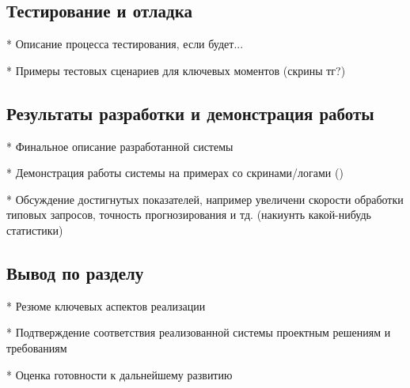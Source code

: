 \subsection{Тестирование и отладка}

*   Описание процесса тестирования, если будет...

*   Примеры тестовых сценариев для ключевых моментов (скрины тг?)

\subsection{Результаты разработки и демонстрация работы}

*   Финальное описание разработанной системы

*   Демонстрация работы системы на примерах со скринами/логами ()

*   Обсуждение достигнутых показателей, например увеличени скорости обработки типовых запросов, точность прогнозирования и тд. (накиунть какой-нибудь статистики)


\subsection{Вывод по разделу}

*   Резюме ключевых аспектов реализации

*   Подтверждение соответствия реализованной системы проектным решениям и требованиям

*   Оценка готовности к дальнейшему развитию
